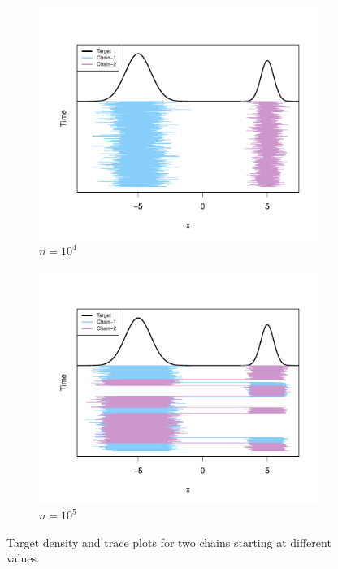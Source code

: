 \documentclass[11pt]{article}
\theoremstyle{remark}
\begin{document}
\begin{figure}[htbp]
    \begin{subfigure}{.5\textwidth}
   \centering
   \includegraphics[width=\linewidth]{plots/gaussian-Targettrace_n1e4.pdf}
   \caption{$n = 10^4$}
   \label{subfig:gauss-trace_1e4}
 \end{subfigure}
 \begin{subfigure}{0.5\textwidth}
   \centering
   \includegraphics[width=\linewidth]{plots/gaussian-Targettrace_n1e5.pdf} 
   \caption{$n = 10^5$}
   \label{subfig:gauss-trace_1e5}
 \end{subfigure}
    \caption{Target density and trace plots for two chains starting at different values.}
    \label{fig:gaussian-trace}
\end{figure}
\end{document}
